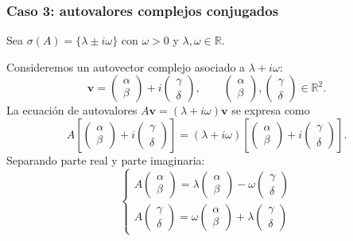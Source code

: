 \subsubsection{Caso 3: autovalores complejos conjugados}

Sea $\sigma(A) = \{ \lambda \pm i \omega \}$ con $\omega > 0$ y $\lambda, \omega \in \mathbb{R}$.

Consideremos un autovector complejo asociado a $\lambda + i \omega$:
\[
    \mathbf{v} = \begin{pmatrix} \alpha \\ \beta \end{pmatrix} + i \begin{pmatrix} \gamma \\ \delta \end{pmatrix}, \qquad \begin{pmatrix} \alpha \\ \beta \end{pmatrix}, \begin{pmatrix} \gamma \\ \delta \end{pmatrix} \in \mathbb{R}^2.
\]
La ecuación de autovalores $A \mathbf{v} = (\lambda + i \omega) \mathbf{v}$ se expresa como
\[
    A \left[ \begin{pmatrix} \alpha \\ \beta \end{pmatrix} + i \begin{pmatrix} \gamma \\ \delta \end{pmatrix} \right]
    = (\lambda + i \omega) \left[ \begin{pmatrix} \alpha \\ \beta \end{pmatrix} + i \begin{pmatrix} \gamma \\ \delta \end{pmatrix} \right].
\]
Separando parte real y parte imaginaria:
\[
    \begin{cases}
        A \begin{pmatrix} \alpha \\ \beta \end{pmatrix} = \lambda \begin{pmatrix} \alpha \\ \beta \end{pmatrix} - \omega \begin{pmatrix} \gamma \\ \delta \end{pmatrix} \\
        A \begin{pmatrix} \gamma \\ \delta \end{pmatrix} = \omega \begin{pmatrix} \alpha \\ \beta \end{pmatrix} + \lambda \begin{pmatrix} \gamma \\ \delta \end{pmatrix}
    \end{cases}
\]
